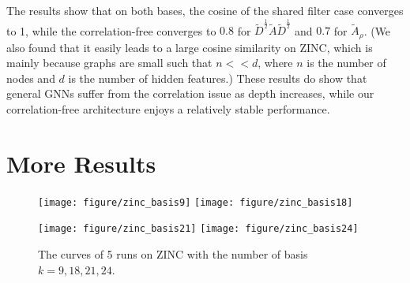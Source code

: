 \documentclass[nohyperref]{article}
\theoremstyle{plain}
\theoremstyle{definition}
\theoremstyle{remark}
\begin{document}
The results show that on both bases, the cosine of the shared filter case converges to 1, while the correlation-free converges to $0.8$ for $\tilde D^{\frac{1}{2}}\tilde A\tilde D^{\frac{1}{2}}$ and $0.7$ for $\tilde A_{\rho}$.
(We also found that it easily leads to a large cosine similarity on ZINC, which is mainly because graphs are small such that $n<<d$, where $n$ is the number of nodes and $d$ is the number of hidden features.)
These results do show that general GNNs suffer from the correlation issue as depth increases, while our correlation-free architecture enjoys a relatively stable performance.

\FloatBarrier
\section{More Results}
\label{more_results}

\begin{figure}[h]
	\centering
	\texttt{[image: figure/zinc\_basis9]}
	\texttt{[image: figure/zinc\_basis18]}
\end{figure}
\begin{figure}[h]
	\texttt{[image: figure/zinc\_basis21]}
	\texttt{[image: figure/zinc\_basis24]}
	\caption{The curves of 5 runs on ZINC with the number of basis $k=9, 18, 21, 24$.}
	\label{fig:more_results1}
\end{figure}
\end{document}

